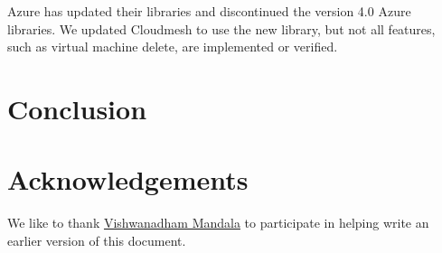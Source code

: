 Azure has updated their libraries and discontinued the version 4.0 Azure
libraries. We updated Cloudmesh to use the new library, but not all
features, such as virtual machine delete, are implemented or verified.

\section{Conclusion}
\label{sec:conclusion}



\section*{Acknowledgements}\label{acknowledgements}

We like to thank
\href{https://github.com/cybertraining-dsc/fa20-523-325/}{Vishwanadham
Mandala} to participate in helping write an earlier version of this
document.




\clearpage

